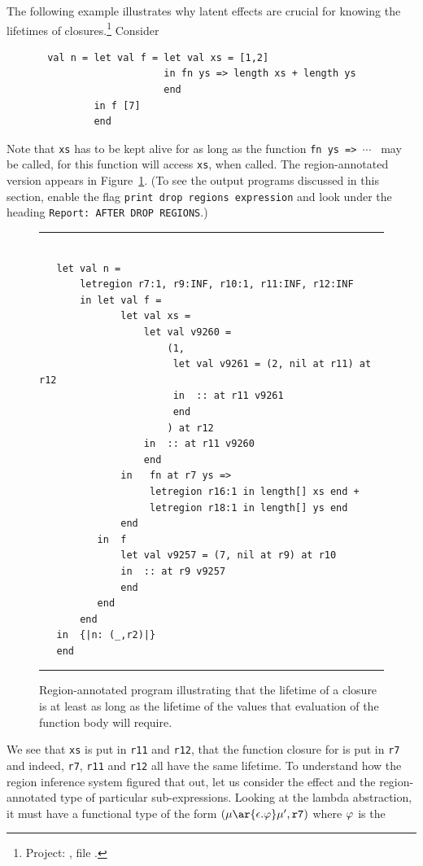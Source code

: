 \documentclass[12pt]{book}
\begin{document}
The following example illustrates why latent effects are crucial for
knowing the lifetimes of closures.\footnote{Project: ,
file .} Consider
\begin{verbatim}
       val n = let val f = let val xs = [1,2]
                           in fn ys => length xs + length ys
                           end
               in f [7]
               end
\end{verbatim}
Note that {\tt xs} has to be kept alive for as long as the
function {\tt fn ys => $\cdots$}~ may be called, for this function
will access {\tt xs}, when called.
The region-annotated version appears in Figure~\ref{lambda1.fig}.  (To
see the output programs discussed in this section, enable the flag
\texttt{print drop regions expression} and look under the heading
{\tt Report: AFTER DROP REGIONS}.)
\begin{figure}
\hrule
\begin{verbatim}

   let val n = 
       letregion r7:1, r9:INF, r10:1, r11:INF, r12:INF 
       in let val f = 
              let val xs = 
                  let val v9260 = 
                      (1, 
                       let val v9261 = (2, nil at r11) at r12
                       in  :: at r11 v9261
                       end 
                      ) at r12
                  in  :: at r11 v9260
                  end 
              in   fn at r7 ys => 
                   letregion r16:1 in length[] xs end + 
                   letregion r18:1 in length[] ys end
              end 
          in  f 
              let val v9257 = (7, nil at r9) at r10
              in  :: at r9 v9257
              end 
          end  
       end
   in  {|n: (_,r2)|}
   end 
\end{verbatim}
\caption{Region-annotated program illustrating that the lifetime of
a closure is at least as long as the lifetime of the values that evaluation
of the function body will require.}
\medskip
\hrule
\label{lambda1.fig}
\end{figure}
We see that {\tt xs} is put in {\tt r11} and {\tt r12}, that the
function closure for  is put in {\tt r7}
and indeed, {\tt r7}, {\tt r11} and {\tt r12} all have the
same lifetime. To understand how the region inference system figured that out, 
let us consider the effect and the 
region-annotated type of particular sub-expressions. Looking at the lambda
abstraction, it must have a functional type of the form 
$(\mu\ar{\epsilon.\rea}\mu', {\tt r7})$ where $\varphi$ is the
\end{document}
